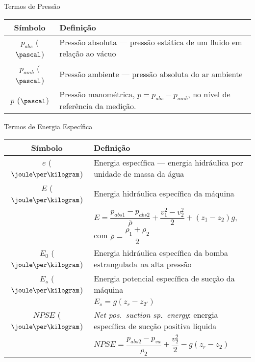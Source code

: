     \begin{frame}{Termos de Pressão}\vspace*{-1em}
        \setlength{\tabcolsep}{2mm}
        \noindent\begin{longtable}{cp{110mm}}
            \alert{Símbolo} & \alert{Definição} \\
            \hline
            $p_{abs}$ ($\pascal$) &
            Pressão absoluta --- pressão estática de um fluido em relação ao vácuo \\
            $p_{amb}$ ($\pascal$) &
            Pressão ambiente --- pressão absoluta do ar ambiente \\
            $p$ ($\pascal$) &
            Pressão manométrica, \alert{$p = p_{abs} - p_{amb}$}, no nível de referência da
            medição. \\
            \hline
        \end{longtable}
    \end{frame}

    \begin{frame}{Termos de Energia Específica}\vspace*{-1em}
        \setlength{\tabcolsep}{2mm}
        \noindent\begin{longtable}{cp{110mm}}
            \alert{Símbolo} & \alert{Definição} \\
            \hline
            $e$ ($\joule\per\kilogram$) &
            Energia específica --- energia hidráulica por unidade de massa da água \\
            $E$ ($\joule\per\kilogram$) &
            Energia hidráulica específica da máquina \\
            & \alert{$E = \dfrac{p_{abs1} - p_{abs2}}{\bar{\rho}} + \dfrac{v_1^2 - v_2^2}{2} +
            (z_1 - z_2)g$}, com \alert{$\bar{\rho} = \dfrac{\rho_1 + \rho_2}{2}$} \\
            $E_0$ ($\joule\per\kilogram$) &
            Energia hidráulica específica da bomba estrangulada na alta pressão \\
            $E_s$ ($\joule\per\kilogram$) &
            Energia potencial específica de sucção da máquina \\
            & \alert{$E_s = g(z_r - z_{2'})$} \\
            $NPSE$ ($\joule\per\kilogram$) &
            \textit{Net pos.~suction sp.~energy\/}: energia específica de sucção positiva
            líquida \\
            & \alert{$NPSE = \dfrac{p_{abs2} - p_{va}}{\rho_2} + \dfrac{v_2^2}{2} - g(z_r -
            z_2)$} \\
            \hline
        \end{longtable}
    \end{frame}


